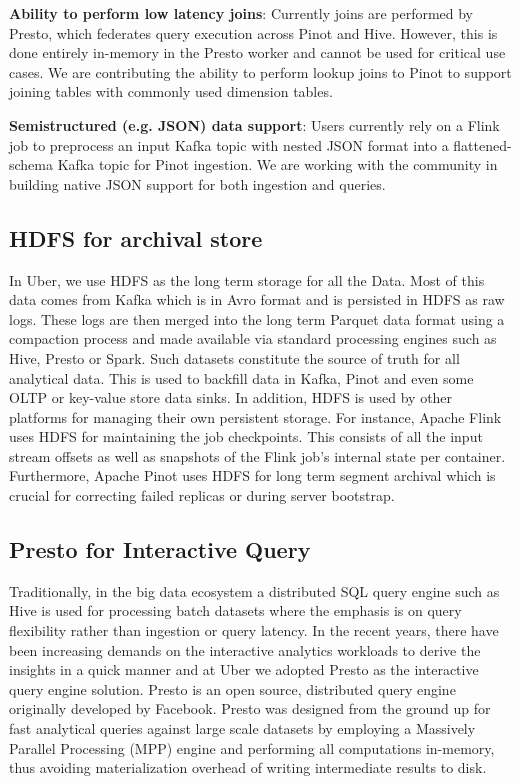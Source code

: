 \documentclass[sigconf]{acmart}
\begin{document}
{\bfseries Ability to perform low latency joins}: Currently joins are performed by Presto, which federates query execution across Pinot and Hive. However, this is done entirely in-memory in the Presto worker and cannot be used for critical use cases. We are contributing the ability to perform lookup joins to Pinot to support joining tables with commonly used dimension tables.

{\bfseries Semistructured (e.g. JSON) data support}: Users currently rely on a Flink job to preprocess an input Kafka topic with nested JSON format into a flattened-schema Kafka topic for Pinot ingestion. We are working with the community in building native JSON support for both ingestion and queries.

\subsection{HDFS for archival store }

In Uber, we use HDFS as the long term storage for all the Data. Most of this data comes from Kafka which is in Avro format and is persisted in HDFS as raw logs. These logs are then merged into the long term Parquet data format using a compaction process and made available via standard processing engines such as Hive, Presto or Spark. Such datasets constitute the source of truth for all analytical data. This is used to backfill data in Kafka, Pinot and even some OLTP or key-value store data sinks. In addition, HDFS is used by other platforms for managing their own persistent storage. For instance, Apache Flink uses HDFS for maintaining the job checkpoints. This consists of all the input stream offsets as well as snapshots of the Flink job's internal state per container. Furthermore, Apache Pinot uses HDFS for long term segment archival which is crucial for correcting failed replicas or during server bootstrap. 

\subsection{Presto for Interactive Query}

Traditionally, in the big data ecosystem a distributed SQL query engine such as Hive\cite{hive} is used for processing batch datasets where the emphasis is on query flexibility rather than ingestion or query latency. In the recent years, there have been increasing demands on the interactive analytics workloads to derive the insights in a quick manner and at Uber we adopted Presto\cite{presto} as the interactive query engine solution. Presto is an open source, distributed query engine originally developed by Facebook. Presto was designed from the ground up for fast analytical queries against large scale datasets by employing a Massively Parallel Processing (MPP) engine and performing all computations in-memory, thus avoiding materialization overhead of writing intermediate results to disk. 
\end{document}
